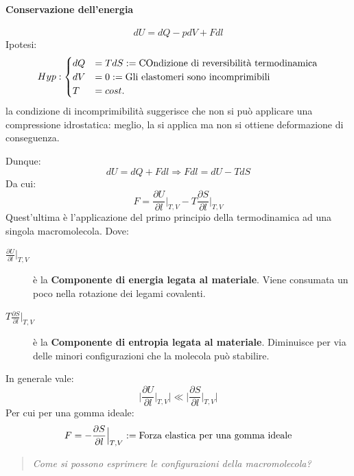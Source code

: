 \paragraph{Conservazione dell'energia}
\begin{equation}
dU = dQ - pdV + Fdl
\end{equation}
Ipotesi:
\begin{equation}
Hyp:%
\begin{cases}
dQ &= TdS := \textup{COndizione di reversibilità termodinamica}\\
dV &= 0 := \textup{Gli elastomeri sono incomprimibili}\\
T &= cost.
\end{cases}
\end{equation}
la condizione di incomprimibilità suggerisce che non si può applicare una compressione idrostatica: meglio, la si applica ma non si ottiene deformazione di conseguenza.

Dunque:
\begin{equation}
dU = dQ + Fdl \Rightarrow Fdl = dU - TdS
\end{equation}
Da cui:
\begin{equation}
F = \frac{\partial U}{\partial l}\Big|_{T,V} - T\frac{\partial S}{\partial l}\Big|_{T,V}
\end{equation}
Quest'ultima è l'applicazione del primo principio della termodinamica ad una singola macromolecola.
Dove:
\begin{description}
\item[$\frac{\partial U}{\partial l}\Big|_{T,V}$] è la \textbf{Componente di energia legata al materiale}. Viene consumata un poco nella rotazione dei legami covalenti.
\item[$T\frac{\partial S}{\partial l}\Big|_{T,V}$] è la \textbf{Componente di entropia legata al materiale}. Diminuisce per via delle minori configurazioni che la molecola può stabilire.
\end{description}
In generale vale:
\begin{equation}
\Big|\frac{\partial U}{\partial l}\big|_{T,V}\Big| \ll \Big|\frac{\partial S}{\partial l}\big|_{T,V}\Big|
\end{equation}
Per cui per una gomma ideale:
\begin{equation}
F = -\frac{\partial S}{\partial l}\Big|_{T,V} :=\textup{Forza elastica per una gomma ideale}
\end{equation}

\begin{quote}
\emph{Come si possono esprimere le configurazioni della macromolecola?}
\end{quote}

